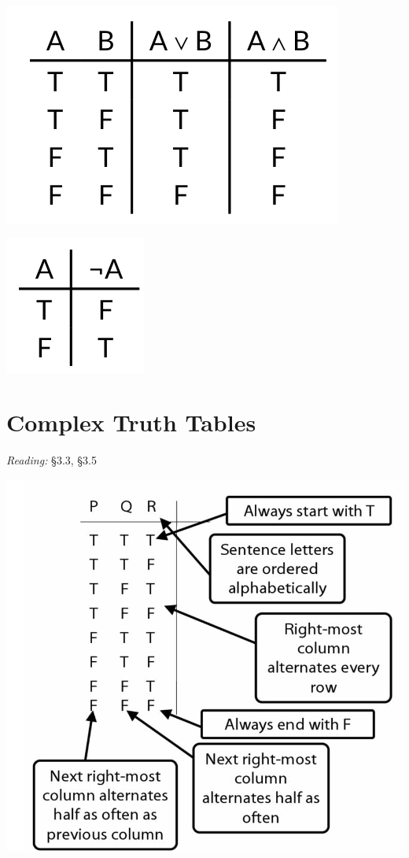 \documentclass[12pt]{extarticle}
\begin{document}
\begin{multicols*}{3}
\begin{center}
\includegraphics[scale=0.3]{img/truth_table_or_and.png}
\end{center}
\begin{center}
\includegraphics[scale=0.3]{img/truth_table_not.png}
\end{center}
 
 
\section{Complex Truth Tables}
 
\emph{Reading:} §3.3, §3.5
 
\begin{center}
\includegraphics[scale=0.3]{img/how_to_write_truth_tables.png}
\end{center}
\begin{minipage}{\columnwidth}
 

\end{minipage}
\end{multicols*}
\end{document}
